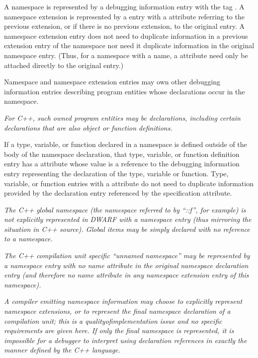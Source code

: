 A namespace is represented by a debugging information entry
with the 
tag . 
A namespace extension is
represented by a  entry 
with a 
attribute referring to the previous extension, or if there
is no previous extension, to the original 
entry. A namespace extension entry does not need to duplicate
information in a previous extension entry of the namespace
nor need it duplicate information in the original namespace
entry. (Thus, for a namespace with a name, 
a 
attribute need only be attached directly to the original
 entry.)

Namespace and namespace extension entries may own other
debugging information entries describing program entities
whose declarations occur in the namespace.

\textit{For C++, such owned program entities may be declarations,
including certain declarations that are also object or
function definitions.}

If a type, variable, or function declared in a namespace is
defined outside of the body of the namespace declaration,
that type, variable, or function definition entry has a
 attribute whose value is a reference to the
debugging information entry representing the declaration of
the type, variable or function. Type, variable, or function
entries with a  attribute do not need
to duplicate information provided by the declaration entry
referenced by the specification attribute.

\textit{The C++ global namespace (the namespace referred to by
``::f'', for example) is not explicitly represented in
DWARF with a namespace entry (thus mirroring the situation
in C++ source).  Global items may be simply declared with no
reference to a namespace.}

\textit{The C++ compilation unit specific ``unnamed namespace'' may
be represented by a namespace entry with no name attribute in
the original namespace declaration entry (and therefore no name
attribute in any namespace extension entry of this namespace).
}

\textit{A compiler emitting namespace information may choose to
explicitly represent namespace extensions, or to represent the
final namespace declaration of a compilation unit; this is a
quality\dash of\dash implementation issue and no specific requirements
are given here. If only the final namespace is represented,
it is impossible for a debugger to interpret using declaration
references in exactly the manner defined by the C++ language.
}


